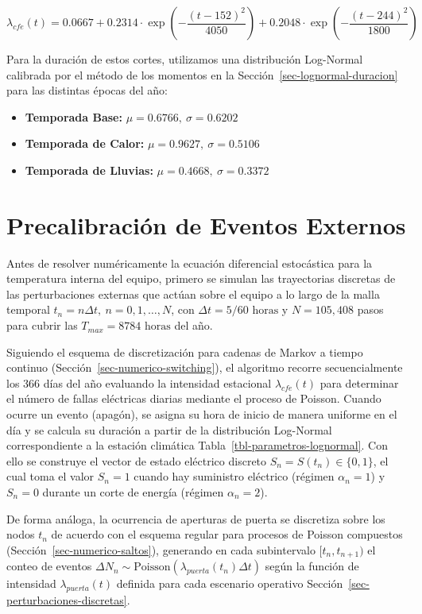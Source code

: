 \documentclass[
  spanish,
  us-letterpaper,
]{scrreprt}
\providecommand{\tightlist}{%
  \setlength{\itemsep}{0pt}\setlength{\parskip}{0pt}}
\numberwithin{equation}{section}
\theoremstyle{plain}
\theoremstyle{plain}
\theoremstyle{definition}
\theoremstyle{plain}
\theoremstyle{remark}
\begin{document}
\[
\lambda_{cfe}(t) = 0.0667 + 0.2314 \cdot \exp\left(-\frac{(t - 152)^2}{4050}\right) + 0.2048 \cdot \exp\left(-\frac{(t - 244)^2}{1800}\right)
\]

Para la duración de estos cortes, utilizamos una distribución Log-Normal
calibrada por el método de los momentos en la
Sección~\ref{sec-lognormal-duracion} para las distintas épocas del año:

\begin{itemize}
\tightlist
\item
  \textbf{Temporada Base:} \(\mu = 0.6766, \ \sigma = 0.6202\)
\item
  \textbf{Temporada de Calor:} \(\mu = 0.9627, \ \sigma = 0.5106\)
\item
  \textbf{Temporada de Lluvias:} \(\mu = 0.4668, \ \sigma = 0.3372\)
\end{itemize}

\section{Precalibración de Eventos
Externos}\label{precalibraciuxf3n-de-eventos-externos}

Antes de resolver numéricamente la ecuación diferencial estocástica para
la temperatura interna del equipo, primero se simulan las trayectorias
discretas de las perturbaciones externas que actúan sobre el equipo a lo
largo de la malla temporal \(t_n = n\Delta t, \ n = 0, 1, \dots, N\),
con \(\Delta t = 5/60\text{ horas}\) y \(N = 105,408\) pasos para cubrir
las \(T_{max} = 8784\text{ horas}\) del año.

Siguiendo el esquema de discretización para cadenas de Markov a tiempo
continuo (Sección~\ref{sec-numerico-switching}), el algoritmo recorre
secuencialmente los 366 días del año evaluando la intensidad estacional
\(\lambda_{cfe}(t)\) para determinar el número de fallas eléctricas
diarias mediante el proceso de Poisson. Cuando ocurre un evento
(apagón), se asigna su hora de inicio de manera uniforme en el día y se
calcula su duración a partir de la distribución Log-Normal
correspondiente a la estación climática
Tabla~\ref{tbl-parametros-lognormal}. Con ello se construye el vector de
estado eléctrico discreto \(S_n = S(t_n) \in \{0, 1\}\), el cual toma el
valor \(S_n = 1\) cuando hay suministro eléctrico (régimen
\(\alpha_n = 1\)) y \(S_n = 0\) durante un corte de energía (régimen
\(\alpha_n = 2\)).

De forma análoga, la ocurrencia de aperturas de puerta se discretiza
sobre los nodos \(t_n\) de acuerdo con el esquema regular para procesos
de Poisson compuestos (Sección~\ref{sec-numerico-saltos}), generando en
cada subintervalo \([t_n, t_{n+1})\) el conteo de eventos
\(\Delta N_n \sim \text{Poisson}(\lambda_{puerta}(t_n)\Delta t)\) según
la función de intensidad \(\lambda_{puerta}(t)\) definida para cada
escenario operativo Sección~\ref{sec-perturbaciones-discretas}.
\end{document}
